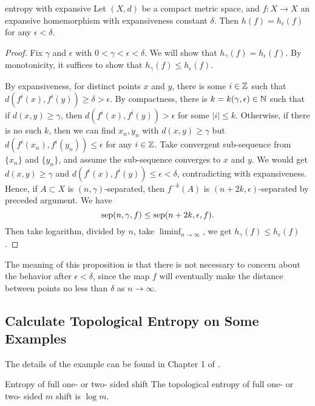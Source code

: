 \documentclass[12pt,a4paper]{article}
\begin{document}
	\begin{proposition}{}{entropy with expansive}
		Let $(X,d)$ be a compact metric space, and $f:X\rightarrow X$ an expansive homemorphism with expansiveness constant $\delta$. Then $h(f)=h_\epsilon (f)$ for any $\epsilon<\delta$.
	\end{proposition}
	\begin{proof}
		Fix $\gamma$ and $\epsilon$ with $0<\gamma<\epsilon<\delta$. We will show that $h_{\gamma}(f)=h_\epsilon (f)$. By monotonicity, it suffices to show that $h_{\gamma}(f)\leq h_{\epsilon}(f)$.
		
		By expansiveness, for distinct points $x$ and $y$, there is some $i\in \mathbb{Z}$ such that $d(f^i(x),f^i(y))\geq \delta>\epsilon$. By compactness, there is $k=k(\gamma,\epsilon)\in \mathbb{N}$ such that if $d(x,y)\geq \gamma$, then $d(f^i(x),f^i(y))>\epsilon$ for some $|i|\leq k$. Otherwise, if there is no such $k$, then we can find $x_n,y_n$ with $d(x,y)\geq \gamma$ but $d(f^i(x_n),f^i(y_n))\leq \epsilon$ for any $i\in \mathbb{Z}$. Take convergent sub-sequence from $\{x_n\}$ and $\{y_n\}$, and assume the sub-sequence converges to $x$ and $y$. We would get $d(x,y)\geq \gamma$ and $d(f^i(x),f^i(y))\leq \epsilon<\delta$, contradicting with expansiveness. Hence, if $A\subset X$ is $(n,\gamma)$-separated, then $f^{-k}(A)$ is $(n+2k,\epsilon)$-separated by preceded argument. We have
		$$
		\text{sep}(n,\gamma,f)\leq \text{sep}(n+2k,\epsilon,f).
		$$
		Then take logarithm, divided by $n$, take $\liminf_{n\to\infty}$, we get $h_{\gamma}(f)\leq h_{\epsilon}(f)$.
	\end{proof}
	The meaning of this proposition is that there is not necessary to concern about the behavior after $\epsilon<\delta$, since the map $f$ will eventually make the distance between points no less than $\delta$ as $n\to \infty$.
	
	\subsection{Calculate Topological Entropy on Some Examples}
	The details of the example can be found in Chapter 1 of \cite{brin2002introduction}.
	
	\newcommand{\T}{\mathbb{T}}
	\newcommand{\R}{\mathbb{R}}
	\begin{proposition}{Entropy of full one- or two- sided shift}{}
		The topological entropy of full one- or two- sided $m$ shift is $\log m$.
	\end{proposition}
\end{document}
